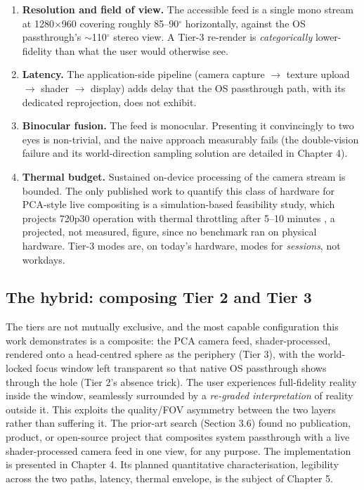 \begin{enumerate}
\item \textbf{Resolution and field of view.} The accessible feed is a single mono stream at 1280$\times$960
covering roughly 85–90$^{\circ}$ horizontally, against the OS passthrough's $\sim$110$^{\circ}$ stereo view. A Tier-3
re-render is \textit{categorically} lower-fidelity than what the user would otherwise see.
\item \textbf{Latency.} The application-side pipeline (camera capture $\rightarrow$ texture upload $\rightarrow$ shader $\rightarrow$ display)
adds delay that the OS passthrough path, with its dedicated reprojection, does not exhibit.
\item \textbf{Binocular fusion.} The feed is monocular. Presenting it convincingly to two eyes is
non-trivial, and the naive approach measurably fails (the double-vision failure and its
world-direction sampling solution are detailed in Chapter 4).
\item \textbf{Thermal budget.} Sustained on-device processing of the camera stream is bounded. The only
published work to quantify this class of hardware for PCA-style live compositing is a
simulation-based feasibility study, which projects 720p30 operation with thermal throttling after
5–10 minutes \citep{laghari2025}, a projected, not measured, figure, since no benchmark ran on
physical hardware. Tier-3 modes are, on today's hardware, modes for \textit{sessions}, not workdays.
\end{enumerate}

\subsection{The hybrid: composing Tier 2 and Tier 3}

The tiers are not mutually exclusive, and the most capable configuration this work demonstrates is a
composite: the PCA camera feed, shader-processed, rendered onto a head-centred sphere as the
periphery (Tier 3), with the world-locked focus window left transparent so that native OS passthrough
shows through the hole (Tier 2's absence trick). The user experiences full-fidelity reality inside
the window, seamlessly surrounded by a \textit{re-graded interpretation} of reality outside it. This
exploits the quality/FOV asymmetry between the two layers rather than suffering it. The prior-art
search (Section 3.6) found no publication, product, or open-source project that composites system
passthrough with a live shader-processed camera feed in one view, for any purpose. The implementation
is presented in Chapter 4. Its planned quantitative characterisation, legibility across the two
paths, latency, thermal envelope, is the subject of Chapter 5.

